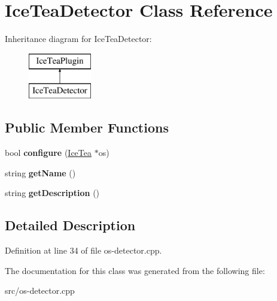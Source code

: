 \hypertarget{class_ice_tea_detector}{}\section{Ice\+Tea\+Detector Class Reference}
\label{class_ice_tea_detector}
Inheritance diagram for Ice\+Tea\+Detector\+:\begin{figure}[H]
\begin{center}
\leavevmode
\includegraphics[height=2.000000cm]{class_ice_tea_detector}
\end{center}
\end{figure}
\subsection*{Public Member Functions}
\begin{DoxyCompactItemize}
\item 
bool {\bfseries configure} (\hyperlink{class_ice_tea}{Ice\+Tea} $\ast$os)\hypertarget{class_ice_tea_detector_afb331d24b64a1fd7218610522f8ca78d}{}\label{class_ice_tea_detector_afb331d24b64a1fd7218610522f8ca78d}

\item 
string {\bfseries get\+Name} ()\hypertarget{class_ice_tea_detector_ad512ef125f7bf0217050ee69f2f2e407}{}\label{class_ice_tea_detector_ad512ef125f7bf0217050ee69f2f2e407}

\item 
string {\bfseries get\+Description} ()\hypertarget{class_ice_tea_detector_ae8e91274385aeafc3600ab4c0739a4f8}{}\label{class_ice_tea_detector_ae8e91274385aeafc3600ab4c0739a4f8}

\end{DoxyCompactItemize}


\subsection{Detailed Description}


Definition at line 34 of file os-\/detector.\+cpp.



The documentation for this class was generated from the following file\+:\begin{DoxyCompactItemize}
\item 
src/os-\/detector.\+cpp\end{DoxyCompactItemize}
